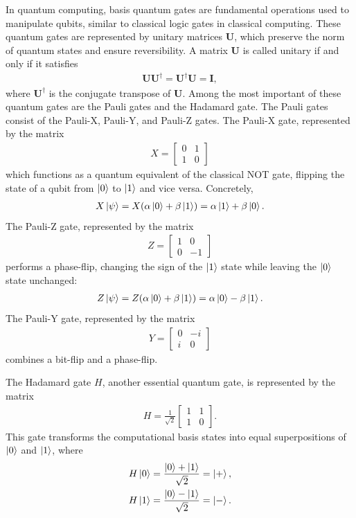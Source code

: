 \documentclass[cryptography,review,submit,pdftex,moreauthors,amsmath,amssymb,aps,strict]{Definitions/mdpi}
\begin{document}
In quantum computing, basis quantum gates are fundamental operations used to manipulate qubits, similar to classical logic gates in classical computing. These quantum gates are represented by unitary matrices $\mathbf{U}$, which preserve the norm of quantum states and ensure reversibility. A matrix $\mathbf{U}$ is called unitary if and only if it satisfies
\begin{align}
    \mathbf{U}\mathbf{U}^{\dagger}=\mathbf{U}^{\dagger}\mathbf{U}=\mathbf{I},
\end{align}
where $\mathbf{U}^{\dagger}$ is the conjugate transpose of $\mathbf{U}$.
Among the most important of these quantum gates are the Pauli gates and the Hadamard gate. The Pauli gates consist of the Pauli-X, Pauli-Y, and Pauli-Z gates. The Pauli-X gate, represented by the matrix 
\begin{align}
    X=\begin{bmatrix} 
    0 & 1\\
    1 & 0
\end{bmatrix}
\end{align}
which functions as a quantum equivalent of the classical NOT gate, flipping the state of a qubit from $\ket{0}$ to $\ket{1}$ and vice versa. Concretely,
\begin{align}
X\ket{\psi}=X(\alpha\ket{0}+\beta\ket{1})=\alpha\ket{1}+\beta\ket{0}.
\end{align}
\noindent The Pauli-Z gate, represented by the matrix
\begin{align}
    Z=\begin{bmatrix} 
    1 & 0\\
    0 & -1
\end{bmatrix}
\end{align}
performs a phase-flip, changing the sign of the $\ket{1}$ state while leaving the $\ket{0}$ state unchanged:
\begin{align}
Z\ket{\psi}=Z(\alpha\ket{0}+\beta\ket{1})=\alpha\ket{0}-\beta\ket{1}.
\end{align}
The Pauli-Y gate, represented by the matrix 
\begin{align}
    Y=\begin{bmatrix} 
    0 & -i\\
    i & 0
\end{bmatrix}
\end{align}
combines a bit-flip and a phase-flip.

\noindent The Hadamard gate $H$, another essential quantum gate, is represented by the matrix 
\begin{align}
    H=\frac{1}{\sqrt{2}}\begin{bmatrix} 
    1 & 1\\
    1 & 0
\end{bmatrix}.
\end{align}
This gate transforms the computational basis states into equal superpositions of $\ket{0}$ and $\ket{1}$, where
\begin{align}
    H\ket{0}=\frac{\ket{0}+\ket{1}}{\sqrt{2}}=\ket{+},\\
    H\ket{1}=\frac{\ket{0}-\ket{1}}{\sqrt{2}}=\ket{-}.
\end{align}
\end{document}
